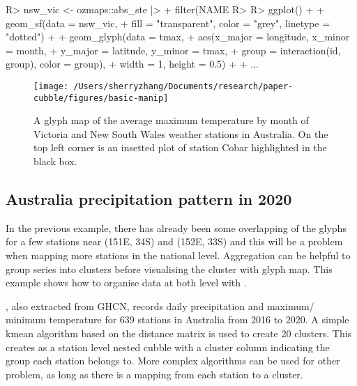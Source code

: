 \documentclass[
]{jss}
\begin{document}
\begin{CodeChunk}
\begin{CodeInput}
R> nsw_vic <- ozmaps::abs_ste |> 
+   filter(NAME %
R> 
R> ggplot() + 
+   geom_sf(data = nsw_vic, 
+           fill = "transparent", color = "grey", linetype = "dotted") + 
+   geom_glyph(data = tmax, 
+              aes(x_major = longitude, x_minor = month, 
+                  y_major = latitude, y_minor = tmax,
+                  group = interaction(id, group), color = group),
+              width = 1, height = 0.5) +
+   ...
\end{CodeInput}
\end{CodeChunk}

\begin{CodeChunk}
\begin{figure}

{\centering \texttt{[image: /Users/sherryzhang/Documents/research/paper-cubble/figures/basic-manip]} 

}

\caption[A glyph map of the average maximum temperature by month of Victoria and New South Wales weather stations in Australia]{A glyph map of the average maximum temperature by month of Victoria and New South Wales weather stations in Australia. On the top left corner is an insetted plot of station Cobar highlighted in the black box.}\label{fig:basic-manip}
\end{figure}
\end{CodeChunk}

\hypertarget{australia-precipitation-pattern-in-2020}{%
\subsection{Australia precipitation pattern in 2020}\label{australia-precipitation-pattern-in-2020}}

In the previous example, there has already been some overlapping of the glyphs for a few stations near (151E, 34S) and (152E, 33S) and this will be a problem when mapping more stations in the national level. Aggregation can be helpful to group series into clusters before visualising the cluster with glyph map. This example shows how to organise data at both level with .

, also extracted from GHCN, records daily precipitation and maximum/ minimum temperature for 639 stations in Australia from 2016 to 2020. A simple kmean algorithm based on the distance matrix is used to create 20 clusters. This creates  as a station level nested cubble with a cluster column indicating the group each station belongs to. More complex algorithms can be used for other problem, as long as there is a mapping from each station to a cluster.
\end{document}
